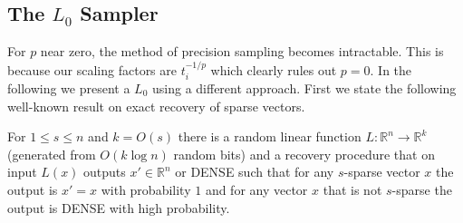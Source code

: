 \subsection{The $L_0$ Sampler}
\label{sec:l0samp}
For $p$ near zero, the method of precision sampling
   becomes intractable. This is because our scaling factors are
   $t_i^{-1/p}$ which clearly rules out $p=0$.
   In the following we present a $L_0$ using a different approach.
First we state the following well-known result on exact recovery of sparse vectors.
\begin{lemma}\label{lem:sparse}
For $1\le s\le n$ and $k=O(s)$ there is a random linear function
$L:\mathbb R^n\to\mathbb R^k$ (generated from $O(k\log n)$ random bits) and a
recovery procedure that on input $L(x)$ outputs $x'\in\mathbb R^n$ or DENSE
such that for any $s$-sparse vector $x$ the output is $x'=x$ with probability
$1$ and for any vector $x$ that is not $s$-sparse the output is DENSE with
high probability.%
%
\end{lemma}

